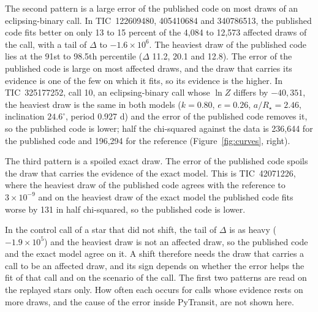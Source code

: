 \documentclass[11pt]{article}
\begin{document}
The second pattern is a large error of the published code on most draws of an eclipsing-binary call. In TIC~122609480, 405410684 and 340786513, the published code fits better on only 13 to 15 percent of the 4,084 to 12,573 affected draws of the call, with a tail of $\Delta$ to $-1.6\times10^{6}$. The heaviest draw of the published code lies at the 91st to 98.5th percentile ($\Delta$ 11.2, 20.1 and 12.8). The error of the published code is large on most affected draws, and the draw that carries its evidence is one of the few on which it fits, so its evidence is the higher. In TIC~325177252, call 10, an eclipsing-binary call whose $\ln Z$ differs by $-40{,}351$, the heaviest draw is the same in both models ($k=0.80$, $e=0.26$, $a/R_\star=2.46$, inclination $24.6^{\circ}$, period 0.927 d) and the error of the published code removes it, so the published code is lower; half the chi-squared against the data is 236,644 for the published code and 196,294 for the reference (Figure~\ref{fig:curves}, right).

The third pattern is a spoiled exact draw. The error of the published code spoils the draw that carries the evidence of the exact model. This is TIC~42071226, where the heaviest draw of the published code agrees with the reference to $3\times10^{-9}$ and on the heaviest draw of the exact model the published code fits worse by 131 in half chi-squared, so the published code is lower.

In the control call of a star that did not shift, the tail of $\Delta$ is as heavy ($-1.9\times10^{5}$) and the heaviest draw is not an affected draw, so the published code and the exact model agree on it. A shift therefore needs the draw that carries a call to be an affected draw, and its sign depends on whether the error helps the fit of that call and on the scenario of the call. The first two patterns are read on the replayed stars only. How often each occurs for calls whose evidence rests on more draws, and the cause of the error inside PyTransit, are not shown here.
\end{document}
